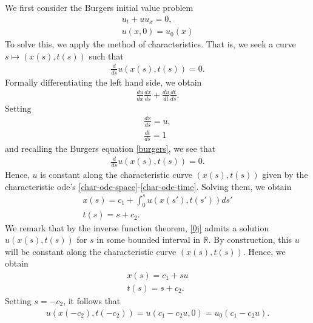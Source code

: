 \documentclass[12pt,reqno]{amsart}
\numberwithin{equation}{section}  %
\numberwithin{figure}{section}
\newcommand{\rr}{\mathbb{R}}
\begin{document}
We first consider the Burgers initial value problem
%
%
\begin{gather}
    \label{burgers}
u_{t} + uu_{x} = 0,
\\
\label{burgers-init}
u(x,0) = u_{0}(x)
\end{gather}
%
%
To solve this, we apply the method of characteristics. That is, we seek a curve
$s \mapsto (x(s), t(s))$ such that
%
%
\begin{equation*}
\begin{split}
\frac{d}{ds} u(x(s), t(s)) = 0.
\end{split}
\end{equation*}
%
Formally differentiating the left hand side, we obtain
%
%
\begin{equation*}
\begin{split}
\frac{du}{dx} \frac{dx}{ds} + \frac{du}{dt} \frac{dt}{ds}.
\end{split}
\end{equation*}
%
%
Setting
%
%
\begin{gather}
    \label{char-ode-space}
    \frac{dx}{ds} = u,
    \\
    \label{char-ode-time}
    \frac{dt}{ds}=1
\end{gather}
and recalling the Burgers equation \eqref{burgers}, we see that
%
%
\begin{equation*}
\begin{split}
\frac{d}{ds} u(x(s), t(s)) = 0.
\end{split}
\end{equation*}
%
%
Hence, $u$ is constant along the characteristic curve $(x(s), t(s))$ given by
the characteristic ode's \eqref{char-ode-space}-\eqref{char-ode-time}. Solving
them, we obtain
\begin{gather}
    \label{0j}
    x(s) = c_{1} + \int_{0}^{s} u(x(s'), t(s'))ds'
    \\
    t(s) = s + c_{2}.
\end{gather}
We remark that by the inverse function theorem, \eqref{0j} admits a solution
$u(x(s), t(s))$ for $s$ in some bounded interval in $\rr$.  By construction, this $u$ will be constant along the characteristic curve $(x(s), t(s))$. Hence, we obtain
%
%
\begin{gather}
    \label{1j}
    x(s) = c_{1} + su
    \\
    \label{2j}
    t(s) = s + c_{2}.
\end{gather}
%
%
Setting $s = -c_{2}$, it follows that 
%
%
%
\begin{equation*}
\begin{split}
u(x(-c_{2}), t(-c_{2})) = u(c_{1} - c_{2}u, 0 ) = u_{0}(c_{1} - c_{2} u).
\end{split}
\end{equation*}
\end{document}
